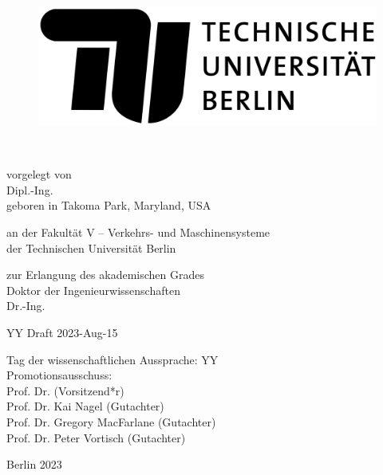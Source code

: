
\thispagestyle{empty}

\begin{flushright}

	\begin{figure}[!h]
  	\begin{minipage}{1.62\linewidth}
	\begin{center}
	\includegraphics[scale=0.085]{chapters/title/tu-logo-2023.png}
  	\end{center}
  	\end{minipage}
	\end{figure}

	\vspace{20mm}

	\LARGE

	\textbf{\hspace{60mm}\Title} \\[2cm]

	\hrulefill

	\large
	vorgelegt von\\

	Dipl.-Ing. \Autor\\
	geboren in Takoma Park, Maryland, USA\\
	\vspace{10mm}

	an der Fakultät V -- Verkehrs- und Maschinensysteme\\
	der Technischen Universität Berlin

	zur Erlangung des akademischen Grades\\
	Doktor der Ingenieurwissenschaften\\
	Dr.-Ing.\\
	\vspace{5mm}

	YY Draft 2023-Aug-15\\

	\hrulefill

 	Tag der wissenschaftlichen Aussprache: YY  \\

	\vspace{5mm}
	Promotionsausschuss:\\
	Prof. Dr. (Vorsitzend*r)\\
	Prof. Dr. Kai Nagel (Gutachter)\\
	Prof. Dr. Gregory MacFarlane (Gutachter)\\
	Prof. Dr. Peter Vortisch (Gutachter)\\
	\vspace{6mm}

	Berlin 2023\\

\end{flushright}